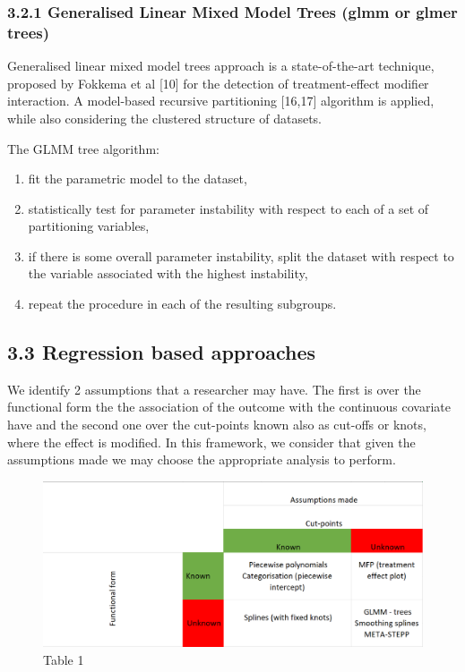 \documentclass[14pt,]{article}
\providecommand{\tightlist}{%
  \setlength{\itemsep}{0pt}\setlength{\parskip}{0pt}}
\let\oldsubparagraph\subparagraph
\renewcommand{\subparagraph}[1]{\oldsubparagraph{#1}\mbox{}}
\begin{document}
\subsubsection{3.2.1 Generalised Linear Mixed Model Trees (glmm or glmer
trees)}\label{generalised-linear-mixed-model-trees-glmm-or-glmer-trees}

Generalised linear mixed model trees approach is a state-of-the-art
technique, proposed by Fokkema et al {[}10{]} for the detection of
treatment-effect modifier interaction. A model-based recursive
partitioning {[}16,17{]} algorithm is applied, while also considering
the clustered structure of datasets.

The GLMM tree algorithm:

\begin{enumerate}
\def\labelenumi{(\arabic{enumi})}
\tightlist
\item
  fit the parametric model to the dataset,
\item
  statistically test for parameter instability with respect to each of a
  set of partitioning variables,
\item
  if there is some overall parameter instability, split the dataset with
  respect to the variable associated with the highest instability,
\item
  repeat the procedure in each of the resulting subgroups.
\end{enumerate}

\subparagraph{}\label{section-1}

\newpage

\subsection{3.3 Regression based
approaches}\label{regression-based-approaches}

We identify 2 assumptions that a researcher may have. The first is over
the functional form the the association of the outcome with the
continuous covariate have and the second one over the cut-points known
also as cut-offs or knots, where the effect is modified. In this
framework, we consider that given the assumptions made we may choose the
appropriate analysis to perform.

\begin{figure}
\centering
\includegraphics{Figs/Assumption.png}
\caption{Table 1}
\end{figure}
\end{document}
